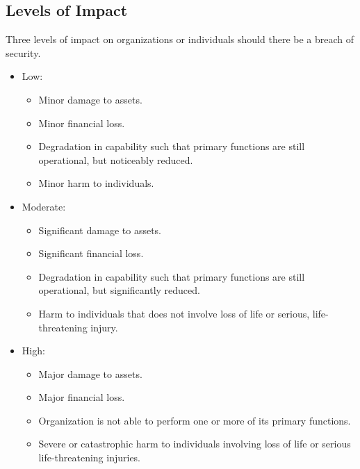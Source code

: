 \documentclass[a4paper]{article}
\theoremstyle{definition}
\theoremstyle{remark}
\begin{document}
	\subsection{Levels of Impact}
	Three levels of impact on organizations or individuals should there be a breach of security.
	\begin{itemize}
		\item Low:
			\begin{itemize}
				\item Minor damage to assets.
				\item Minor financial loss.
				\item Degradation in capability such that primary functions are still
					operational, but noticeably reduced.
				\item Minor harm to individuals.
			\end{itemize}
		\item Moderate:
			\begin{itemize}
				\item Significant damage to assets.
				\item Significant financial loss.
				\item Degradation in capability such that primary functions are still
					operational, but significantly reduced.
				\item Harm to individuals that does not involve loss of life or serious,
					life-threatening injury.
			\end{itemize}
		\item High:
			\begin{itemize}
				\item Major damage to assets.
				\item Major financial loss.
				\item Organization is not able to perform one or more of its primary
					functions.
				\item Severe or catastrophic harm to individuals involving loss of life
					or serious life-threatening injuries.
			\end{itemize}
	\end{itemize}
	
\end{document}
